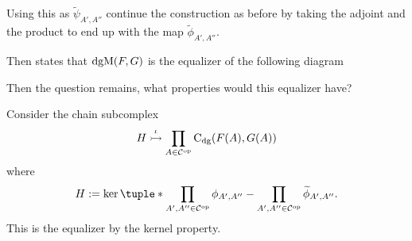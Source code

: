 \begin{remark}
\begin{center}
    \end{center}
    Using this as \( \widetilde{\psi}_{A', A''} \) continue the construction as before by taking the adjoint and the product to end up with the map \( \widetilde{\phi}_{A', A''} \).

    Then \cite[Proposition 6.3.1]{Borceux_1994} states that \( \operatorname{dgM}(F, G) \) is the equalizer of the following diagram
    \begin{center}
    \end{center}
    Then the question remains, what properties would this equalizer have?
    
    Consider the chain subcomplex
    \[
        H \stackrel{\iota}{\rightarrowtail} \prod_{A \in {\mathcal{C}}^{\operatorname{op}}} \operatorname{C}_{\operatorname{dg}}(F(A), G(A))
    \]
    where
    \[
        H := \ker\tuple*{\prod\limits_{A', A'' \in \Cc^{\op}} \phi_{A', A''} - \prod_{A', A'' \in \Cc^{\op}} \widetilde{\phi}_{A', A''}}.
    \]
    This is the equalizer by the kernel property.


\end{remark}
